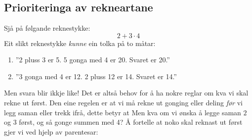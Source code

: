 




\section{\rrek}
\subsection*{Prioriteringa av rekneartane}
Sjå på følgande reknestykke:
\[ 2+3\cdot4 \]
Eit slikt reknestykke \textsl{kunne} ein tolka på to måtar:
\begin{enumerate}
	\item ''2 pluss 3 er 5. 5 gonga med 4 er 20. Svaret er 20.''
	\item ''3 gonga med 4 er 12. 2 pluss 12 er 14. Svaret er 14.''
\end{enumerate}
Men svara blir ikkje like! Det er altså behov for å ha nokre reglar om kva vi skal rekne ut først. Den eine regelen er at vi må rekne ut gonging eller deling \textsl{før} vi legg saman eller trekk ifrå, dette betyr at \regv
\st{ \vs
{}
}
Men kva om vi ønska å legge saman $ 2 $ og $ 3 $ først, og så gonge summen med 4? Å fortelle at noko skal reknast ut først gjer vi ved hjelp av parentesar: \regv
\st{\vs
{}
}\regv

\newpage
{}
